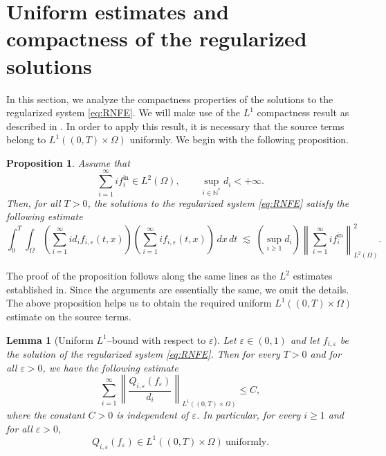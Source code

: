 \documentclass[a4paper,12pt,reqno]{amsart}
\theoremstyle{plain}
\newtheorem{lem}[thm]{Lemma}
\newtheorem{prop}[thm]{Proposition}
\numberwithin{equation}{section}
\begin{document}
	
	\section{\textbf{Uniform estimates and compactness of the regularized solutions}}\label{UECRS}
	
	In this section, we analyze the compactness properties of the solutions to the regularized
	system \eqref{eq:RNFE}. We will make use of the $L^1$ compactness result as described
	in \cite{Pierre2010}. In order to apply this result, it is necessary that the source terms
	belong to $L^1((0,T)\times\Omega)$ uniformly. We begin with the following proposition.
	\begin{prop}
		\label{prop:dual_estimate}
		Assume that
		\[
		\sum_{i=1}^{\infty} i f_i^{\mathrm{in}} \in L^2(\Omega),
		\qquad
		\sup_{i\in\mathbb{N}^*} d_i < +\infty.
		\]
		Then, for all $T>0$, the solutions to the regularized system \eqref{eq:RNFE} satisfy the following estimate
		\begin{equation}
			\label{eq:dual_estimate}
			\int_0^T \int_\Omega
			\left( \sum_{i=1}^{\infty} i d_i f_{i,\varepsilon}(t,x) \right)
			\left( \sum_{i=1}^{\infty} i f_{i,\varepsilon}(t,x) \right)
			\,dx\,dt
			\;\lesssim\;
			\left( \sup_{i\ge1} d_i \right)
			\left\|
			\sum_{i=1}^{\infty} i f_i^{\mathrm{in}}
			\right\|_{L^2(\Omega)}^{2}.
		\end{equation}
	\end{prop}
	The proof of the proposition follows along the same lines as the $L^2$ estimates
	established in\cite{desvillettes2007global, canizo2010absence}. Since the arguments are
	essentially the same, we omit the details. The above proposition helps us to obtain the required  uniform $L^1((0,T)\times\Omega)$ estimate on the source terms. 
	\begin{lem}[Uniform $L^1$--bound with respect to $\varepsilon$] \label{bound on NR operator}
		Let $\varepsilon\in(0,1)$ and let $f_{i,\varepsilon}$ be the solution of the regularized system \eqref{eq:RNFE}. Then for every $T>0$ and for all $\varepsilon>0$, we have the following estimate
		\[
		\sum_{i=1}^\infty
		\left\|
		\frac{Q_{i,\varepsilon}(f_{\varepsilon})}{d_i}
		\right\|_{L^1((0,T)\times\Omega)}
		\le C,
		\]
		where the constant $C>0$ is independent of $\varepsilon$.
		In particular, for every $i\ge1$ and for all $\varepsilon>0$,
		\[
		Q_{i,\varepsilon}(f_{\varepsilon})\in L^1((0,T)\times\Omega) \ \text{uniformly}.
		\]
	\end{lem}
	
\end{document}
